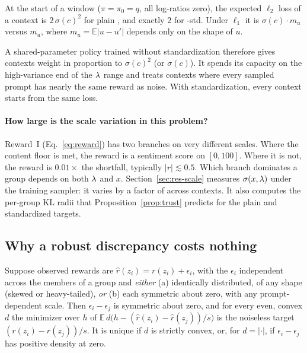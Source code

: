 \begin{proposition}
\label{prop:balance}
At the start of a window ($\pi = \pi_0 = q$, all log-ratios zero), the expected
$\ell_2$ loss of a context is $2\,\sigma(c)^2$ for plain \rrebel{}, and exactly
$2$ for \rrebel{}-std. Under $\ell_1$ it is $\sigma(c)\cdot m_u$ versus $m_u$,
where $m_u = \mathbb{E}|u-u'|$ depends only on the shape of $u$.
\end{proposition}

A shared-parameter policy trained without standardization therefore gives
contexts weight in proportion to $\sigma(c)^2$ (or $\sigma(c)$). It spends its
capacity on the high-variance end of the $\lambda$ range and treats contexts
where every sampled prompt has nearly the same reward as noise. With
standardization, every context starts from the same loss.

\paragraph{How large is the scale variation in this problem?}
Reward~I (Eq.~\ref{eq:reward}) has two branches on very
different scales. Where the content floor is met, the reward is a sentiment
score on $[0,100]$. Where it is not, the reward is $0.01\times$ the shortfall,
typically $|r| \lesssim 0.5$. Which branch
dominates a group depends on both $\lambda$ and $x$.
Section~\ref{sec:res-scale} measures $\sigma(x,\lambda)$ under the training
sampler: it varies by a factor of \sRangeQ{} across contexts. It also computes
the per-group KL radii that Proposition~\ref{prop:trust} predicts for the plain
and standardized targets.

\subsection{Why a robust discrepancy costs nothing}
\label{sec:th-robust}

\begin{proposition}
\label{prop:symm}
Suppose observed rewards are $\hat r(z_i) = r(z_i) + \epsilon_i$, with the
$\epsilon_i$ independent across the members of a group and \emph{either}
(a) identically distributed, of any shape (skewed or heavy-tailed), \emph{or}
(b) each symmetric about zero, with any prompt-dependent scale. Then
$\epsilon_i - \epsilon_j$ is symmetric about zero, and for every even, convex
$d$ the minimizer over $h$ of
$\mathbb{E}\, d\bigl(h - (\hat r(z_i) - \hat r(z_j))/s\bigr)$ is the noiseless
target $(r(z_i) - r(z_j))/s$. It is unique if $d$ is strictly convex, or, for
$d = |\cdot|$, if $\epsilon_i - \epsilon_j$ has positive density at zero.
\end{proposition}

